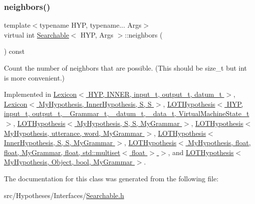 \subsubsection{\texorpdfstring{neighbors()}{neighbors()}}
{\footnotesize\ttfamily template$<$typename H\+YP, typename... Args$>$ \\
virtual int \hyperlink{class_searchable}{Searchable}$<$ H\+YP, Args $>$\+::neighbors (\begin{DoxyParamCaption}{ }\end{DoxyParamCaption}) const\hspace{0.3cm}{\ttfamily [pure virtual]}}



Count the number of neighbors that are possible. (This should be size\+\_\+t but int is more convenient.) 



Implemented in \hyperlink{class_lexicon_a6419f323377d4c524363707eee0cae09}{Lexicon$<$ H\+Y\+P, I\+N\+N\+E\+R, input\+\_\+t, output\+\_\+t, datum\+\_\+t $>$}, \hyperlink{class_lexicon_a6419f323377d4c524363707eee0cae09}{Lexicon$<$ My\+Hypothesis, Inner\+Hypothesis, S, S $>$}, \hyperlink{class_l_o_t_hypothesis_a097cde606ec3f277fdeb92145599027f}{L\+O\+T\+Hypothesis$<$ H\+Y\+P, input\+\_\+t, output\+\_\+t, \+\_\+\+Grammar\+\_\+t, \+\_\+datum\+\_\+t, \+\_\+data\+\_\+t, Virtual\+Machine\+State\+\_\+t $>$}, \hyperlink{class_l_o_t_hypothesis_a097cde606ec3f277fdeb92145599027f}{L\+O\+T\+Hypothesis$<$ My\+Hypothesis, S, S, My\+Grammar $>$}, \hyperlink{class_l_o_t_hypothesis_a097cde606ec3f277fdeb92145599027f}{L\+O\+T\+Hypothesis$<$ My\+Hypothesis, utterance, word, My\+Grammar $>$}, \hyperlink{class_l_o_t_hypothesis_a097cde606ec3f277fdeb92145599027f}{L\+O\+T\+Hypothesis$<$ Inner\+Hypothesis, S, S, My\+Grammar $>$}, \hyperlink{class_l_o_t_hypothesis_a097cde606ec3f277fdeb92145599027f}{L\+O\+T\+Hypothesis$<$ My\+Hypothesis, float, float, My\+Grammar, float, std\+::multiset$<$ float $>$ $>$}, and \hyperlink{class_l_o_t_hypothesis_a097cde606ec3f277fdeb92145599027f}{L\+O\+T\+Hypothesis$<$ My\+Hypothesis, Object, bool, My\+Grammar $>$}.



The documentation for this class was generated from the following file\+:\begin{DoxyCompactItemize}
\item 
src/\+Hypotheses/\+Interfaces/\hyperlink{_searchable_8h}{Searchable.\+h}\end{DoxyCompactItemize}
